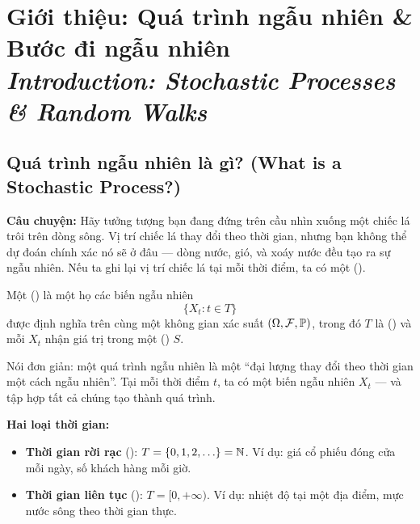 \chapter{Giới thiệu: Quá trình ngẫu nhiên \& Bước đi ngẫu nhiên\\{\normalsize\textit{Introduction: Stochastic Processes \& Random Walks}}}
\label{ch:intro}

\section{Quá trình ngẫu nhiên là gì? (What is a Stochastic Process?)}
\label{sec:what-is-sp}

\textbf{Câu chuyện:} Hãy tưởng tượng bạn đang đứng trên cầu nhìn xuống một chiếc lá trôi trên dòng sông.
Vị trí chiếc lá thay đổi theo thời gian, nhưng bạn không thể dự đoán chính xác nó sẽ ở đâu ---
dòng nước, gió, và xoáy nước đều tạo ra sự ngẫu nhiên.
Nếu ta ghi lại vị trí chiếc lá tại mỗi thời điểm, ta có một  ().

\begin{dinhnghia}
\label{def:stochastic-process}
Một  () là một họ các biến ngẫu nhiên
\[
  \{X_t : t \in T\}
\]
được định nghĩa trên cùng một không gian xác suất $(\Omega, \mathcal{F}, \mathbb{P})$,
trong đó $T$ là  () và mỗi $X_t$ nhận giá trị trong
một  () $S$.
\end{dinhnghia}

\begin{tomtat}
Nói đơn giản: một quá trình ngẫu nhiên là một ``đại lượng thay đổi theo thời gian một cách ngẫu nhiên''.
Tại mỗi thời điểm $t$, ta có một biến ngẫu nhiên $X_t$ --- và tập hợp tất cả chúng tạo thành quá trình.
\end{tomtat}

\textbf{Hai loại thời gian:}
\begin{itemize}[nosep]
  \item \textbf{Thời gian rời rạc} (): $T = \{0, 1, 2, \ldots\} = \mathbb{N}$.
    Ví dụ: giá cổ phiếu đóng cửa mỗi ngày, số khách hàng mỗi giờ.
  \item \textbf{Thời gian liên tục} (): $T = [0, +\infty)$.
    Ví dụ: nhiệt độ tại một địa điểm, mực nước sông theo thời gian thực.
\end{itemize}

